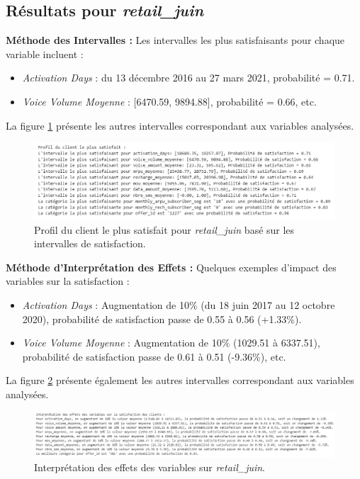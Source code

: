 \subsection{Résultats pour \textit{retail\_juin}}

\textbf{Méthode des Intervalles :}  
Les intervalles les plus satisfaisants pour chaque variable incluent :  
\begin{itemize}
    \item \textit{Activation Days} : du 13 décembre 2016 au 27 mars 2021, probabilité = 0.71.
    \item \textit{Voice Volume Moyenne} : [6470.59, 9894.88], probabilité = 0.66, etc.
\end{itemize}
La figure \ref{fig:profil_satisfait_retail} présente les autres intervalles correspondant aux variables analysées.

\begin{figure}[H]
    \centering
    \includegraphics[width=0.9\linewidth]{capture_modele_34.png}
    \caption{Profil du client le plus satisfait pour \textit{retail\_juin} basé sur les intervalles de satisfaction.}
    \label{fig:profil_satisfait_retail}
\end{figure}

\textbf{Méthode d'Interprétation des Effets :}  
Quelques exemples d'impact des variables sur la satisfaction :  
\begin{itemize}
    \item \textit{Activation Days} : Augmentation de 10\% (du 18 juin 2017 au 12 octobre 2020), probabilité de satisfaction passe de 0.55 à 0.56 (+1.33\%).
    \item \textit{Voice Volume Moyenne} : Augmentation de 10\% (1029.51 à 6337.51), probabilité de satisfaction passe de 0.61 à 0.51 (-9.36\%), etc.
\end{itemize}
La figure \ref{fig:interpretation_effects_retail} présente également les autres intervalles correspondant aux variables analysées.

\begin{figure}[H]
    \centering
    \includegraphics[width=0.9\linewidth]{capture_modele_37.png}
    \caption{Interprétation des effets des variables sur \textit{retail\_juin}.}
    \label{fig:interpretation_effects_retail}
\end{figure}

